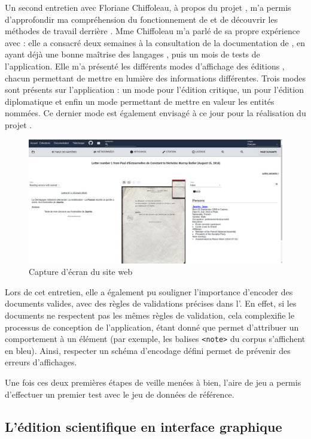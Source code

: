 Un second entretien avec Floriane Chiffoleau, à propos du projet \disco, m'a permis d'approfondir ma compréhension du fonctionnement de \tp et de découvrir les méthodes de travail derrière \disco. Mme Chiffoleau m'a parlé de sa propre expérience avec \tp : elle a consacré deux semaines à la consultation de la documentation de \tp, en ayant déjà une bonne maîtrise des langages \XML, puis un mois de tests de l'application. Elle m'a présenté les différents modes d'affichage des éditions \disco, chacun permettant de mettre en lumière des informations différentes. Trois modes sont présents sur l'application \disco : un mode pour l'édition critique, un pour l'édition diplomatique et enfin un mode permettant de mettre en valeur les entités nommées. Ce dernier mode est également envisagé à ce jour pour la réalisation du projet \COREL. 

\begin{figure}[h]
    \centering
    \includegraphics[width=\textwidth]{images/discholed.png}
    \caption{Capture d'écran du site web \disco}
\end{figure}

Lors de cet entretien, elle a également pu souligner l'importance d'encoder des documents \TEI valides, avec des règles de validations précises dans l'\ODD. En effet, si les documents ne respectent pas les mêmes règles de validation, cela complexifie le processus de conception de l'application, étant donné que \tp permet d'attribuer un comportement à un élément (par exemple, les balises \texttt{<note>} du corpus \COREL s'affichent en bleu). Ainsi, respecter un schéma d'encodage défini permet de prévenir des erreurs d'affichages. 

Une fois ces deux premières étapes de veille menées à bien, l'\og aire de jeu \fg \tp a permis d'effectuer un premier test avec le jeu de données \tei de référence. 

\subsection{L’édition scientifique en interface graphique}

